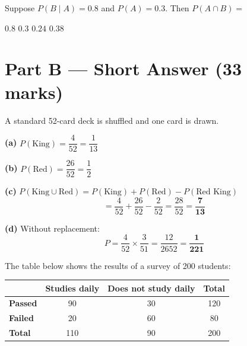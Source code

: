 \documentclass[addpoints]{exam}
\begin{document}
\begin{questions}
\question[1] Suppose $P(B \mid A) = 0.8$ and $P(A) = 0.3$. Then $P(A \cap B) =$
\begin{choices}
    \choice $0.8$
    \choice $0.3$
    \correctchoice $0.24$
    \choice $0.38$
\end{choices}


\section*{Part B --- Short Answer (33 marks)}

\question A standard 52-card deck is shuffled and one card is drawn.
\begin{solution}[8cm]
\textbf{(a)} $P(\text{King}) = \dfrac{4}{52} = \dfrac{1}{13}$

\textbf{(b)} $P(\text{Red}) = \dfrac{26}{52} = \dfrac{1}{2}$

\textbf{(c)} $P(\text{King} \cup \text{Red}) = P(\text{King}) + P(\text{Red}) - P(\text{Red King})$
\[
= \frac{4}{52} + \frac{26}{52} - \frac{2}{52} = \frac{28}{52} = \mathbf{\frac{7}{13}}
\]

\textbf{(d)} Without replacement:
\[
P = \frac{4}{52} \times \frac{3}{51} = \frac{12}{2652} = \mathbf{\frac{1}{221}}
\]
\end{solution}

\question The table below shows the results of a survey of 200 students:

\begin{center}
\begin{tabular}{lccc}
\toprule
 & \textbf{Studies daily} & \textbf{Does not study daily} & \textbf{Total} \\
\midrule
\textbf{Passed} & 90 & 30 & 120 \\
\textbf{Failed} & 20 & 60 & 80 \\
\midrule
\textbf{Total} & 110 & 90 & 200 \\
\bottomrule
\end{tabular}
\end{center}


\end{questions}
\end{document}
